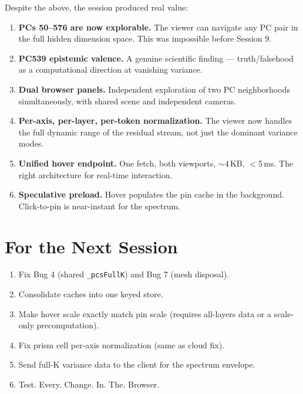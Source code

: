 \documentclass[11pt,a4paper]{article}
\begin{document}
Despite the above, the session produced real value:

\begin{enumerate}
  \item \textbf{PCs 50--576 are now explorable.} The viewer can navigate any PC pair in the full hidden dimension space. This was impossible before Session 9.

  \item \textbf{PC539 epistemic valence.} A genuine scientific finding --- truth/falsehood as a computational direction at vanishing variance.

  \item \textbf{Dual browser panels.} Independent exploration of two PC neighborhoods simultaneously, with shared scene and independent cameras.

  \item \textbf{Per-axis, per-layer, per-token normalization.} The viewer now handles the full dynamic range of the residual stream, not just the dominant variance modes.

  \item \textbf{Unified hover endpoint.} One fetch, both viewports, $\sim$4\,KB, $<$5\,ms. The right architecture for real-time interaction.

  \item \textbf{Speculative preload.} Hover populates the pin cache in the background. Click-to-pin is near-instant for the spectrum.
\end{enumerate}

\section{For the Next Session}

\begin{enumerate}
  \item Fix Bug 4 (shared \texttt{\_pcsFullK}) and Bug 7 (mesh disposal).
  \item Consolidate caches into one keyed store.
  \item Make hover scale exactly match pin scale (requires all-layers data or a scale-only precomputation).
  \item Fix prism cell per-axis normalization (same as cloud fix).
  \item Send full-K variance data to the client for the spectrum envelope.
  \item Test. Every. Change. In. The. Browser.
\end{enumerate}
\end{document}
